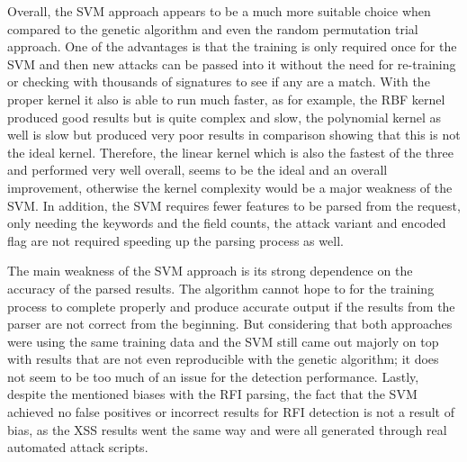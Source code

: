 Overall, the SVM approach appears to be a much more suitable choice when compared to the genetic algorithm and even the random permutation trial approach.  One of the advantages is that the training is only required once for the SVM and then new attacks can be passed into it without the need for re-training or checking with thousands of signatures to see if any are a match.  With the proper kernel it also is able to run much faster, as for example, the RBF kernel produced good results but is quite complex and slow, the polynomial kernel as well is slow but produced very poor results in comparison showing that this is not the ideal kernel.  Therefore, the linear kernel which is also the fastest of the three and performed very well overall, seems to be the ideal and an overall improvement, otherwise the kernel complexity would be a major weakness of the SVM.  In addition, the SVM requires fewer features to be parsed from the request, only needing the keywords and the field counts, the attack variant and encoded flag are not required speeding up the parsing process as well.

The main weakness of the SVM approach is its strong dependence on the accuracy of the parsed results.  The algorithm cannot hope to for the training process to complete properly and produce accurate output if the results from the parser are not correct from the beginning.  But considering that both approaches were using the same training data and the SVM still came out majorly on top with results that are not even reproducible with the genetic algorithm; it does not seem to be too much of an issue for the detection performance.  Lastly, despite the mentioned biases with the RFI parsing, the fact that the SVM achieved no false positives or incorrect results for RFI detection is not a result of bias, as the XSS results went the same way and were all generated through real automated attack scripts.
